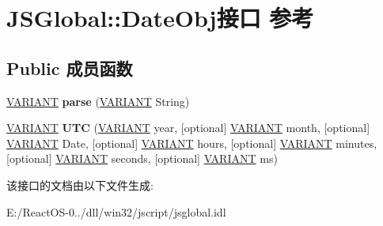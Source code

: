 \hypertarget{interface_j_s_global_1_1_date_obj}{}\section{J\+S\+Global\+:\+:Date\+Obj接口 参考}
\label{interface_j_s_global_1_1_date_obj}
\subsection*{Public 成员函数}
\begin{DoxyCompactItemize}
\item 
\mbox{\label{interface_j_s_global_1_1_date_obj_ae9ff5d2c371c2c624fa859ca43367c52}} 
\hyperlink{structtag_v_a_r_i_a_n_t}{V\+A\+R\+I\+A\+NT} {\bfseries parse} (\hyperlink{structtag_v_a_r_i_a_n_t}{V\+A\+R\+I\+A\+NT} String)
\item 
\mbox{\label{interface_j_s_global_1_1_date_obj_aadeb08ec3a98d196ad0998bab5904df6}} 
\hyperlink{structtag_v_a_r_i_a_n_t}{V\+A\+R\+I\+A\+NT} {\bfseries U\+TC} (\hyperlink{structtag_v_a_r_i_a_n_t}{V\+A\+R\+I\+A\+NT} year, \mbox{[}optional\mbox{]} \hyperlink{structtag_v_a_r_i_a_n_t}{V\+A\+R\+I\+A\+NT} month, \mbox{[}optional\mbox{]} \hyperlink{structtag_v_a_r_i_a_n_t}{V\+A\+R\+I\+A\+NT} Date, \mbox{[}optional\mbox{]} \hyperlink{structtag_v_a_r_i_a_n_t}{V\+A\+R\+I\+A\+NT} hours, \mbox{[}optional\mbox{]} \hyperlink{structtag_v_a_r_i_a_n_t}{V\+A\+R\+I\+A\+NT} minutes, \mbox{[}optional\mbox{]} \hyperlink{structtag_v_a_r_i_a_n_t}{V\+A\+R\+I\+A\+NT} seconds, \mbox{[}optional\mbox{]} \hyperlink{structtag_v_a_r_i_a_n_t}{V\+A\+R\+I\+A\+NT} ms)
\end{DoxyCompactItemize}


该接口的文档由以下文件生成\+:\begin{DoxyCompactItemize}
\item 
E\+:/\+React\+O\+S-\/0../dll/win32/jscript/jsglobal.\+idl\end{DoxyCompactItemize}
